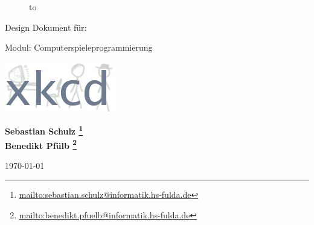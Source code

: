 \documentclass[Skript.tex]{subfiles}
\begin{document}
\begin{figure}
  \begin{center}
    \hbox to 
  \end{center}
\end{figure}

\begin{center}
\rule{0pt}{0pt}
\vfill

\begin{Huge}
Design Dokument für:
\end{Huge}
\vfill
\begin{Huge}
\bf{\gname}
\end{Huge}

\vfill


{\large Modul: Computerspieleprogrammierung}


\vfill
 \includegraphics[scale=5]{Grafik/logo.png}


\vfill


\begin{large}
\bf{Sebastian Schulz} \footnote{\url{mailto:sebastian.schulz@informatik.hs-fulda.de}} \\ 
\bf{Benedikt Pfülb} \footnote{\url{mailto:benedikt.pfuelb@informatik.hs-fulda.de}} \\ 
\vfill

\end{large}

\vfill
\vfill
\vfill
\vfill
\vfill
\vfill
\vfill
\today
\vfill
\vfill
\end{center}
\thispagestyle{empty}

\newpage

\tableofcontents
\thispagestyle{empty}
\newpage
\end{document}
